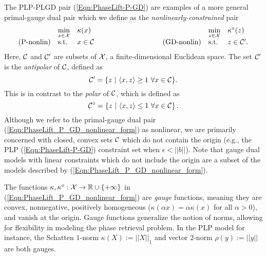 The PLP-PLGD pair (\ref{Eqn:PhaseLift-P-GD}) are examples of a more general primal-gauge dual pair which we define as the \textit{nonlinearly-constrained} pair
\begin{equation} 			\label{Eqn:PhaseLift_P_GD_nonlinear_form}
\begin{array}{lllllll}
	&	\min\limits_{\substack{x \in \caX}}
		&	\kappa(x)
			&
				&	\min\limits_{\substack{z \in \caX}}
					&	\kappa^\circ(z)
						\\
\textnormal{(P-nonlin)}
	&	\st
		& 	x \in \caC
			&	\hspace{3cm} 	\textnormal{(GD-nonlin)}
				&	\st
					&	z \in \caC'.
\end{array}
\end{equation}
Here, ${\mathcal C}$ and ${\mathcal C}'$ are subsets of ${\mathcal X}$, a finite-dimensional Euclidean space.  The set ${\mathcal C}'$ is the \textit{antipolar} of ${\mathcal C}$, defined as
\begin{equation}  			\label{Def:antipolar_set}
{\mathcal C}' = \{ z \ | \ \langle x, z \rangle \geq 1 \ \forall x \in {\mathcal C} \}.
\end{equation}
This is in contrast to the \textit{polar} of ${\mathcal C}$, which is defined as
\begin{equation} 			\label{Def:polar}
{\mathcal C}^\circ = \left\{ z \ | \ \langle x, z \rangle \leq 1 \ \forall x \in {\mathcal C} \right\}.
\end{equation}
Although we refer to the primal-gauge dual pair (\ref{Eqn:PhaseLift_P_GD_nonlinear_form}) as nonlinear, we are primarily concerned with closed, convex sets ${\mathcal C}$ which do not contain the origin (e.g., the PLP (\ref{Eqn:PhaseLift-P-GD}) constraint set when $\epsilon < ||b||$).  
Note that gauge dual models with linear constraints which do not include the origin are a subset of the models described by (\ref{Eqn:PhaseLift_P_GD_nonlinear_form}).

The functions $\kappa, \kappa^\circ : {\mathcal X} \rightarrow {\mathbb R} \cup \{+\infty\}$ in (\ref{Eqn:PhaseLift_P_GD_nonlinear_form}) are \textit{gauge} functions, meaning they are convex, nonnegative, positively homogeneous ($\kappa(\alpha x) = \alpha \kappa(x)$ for all $\alpha > 0$), and vanish at the origin.  Gauge functions generalize the notion of norms, allowing for flexibility in modeling the phase retrieval problem.  In the PLP model for instance, the Schatten $1$-norm $\kappa(X) := || X ||_1$ and  vector $2$-norm $\rho(y) := ||y||$ are both gauges.

